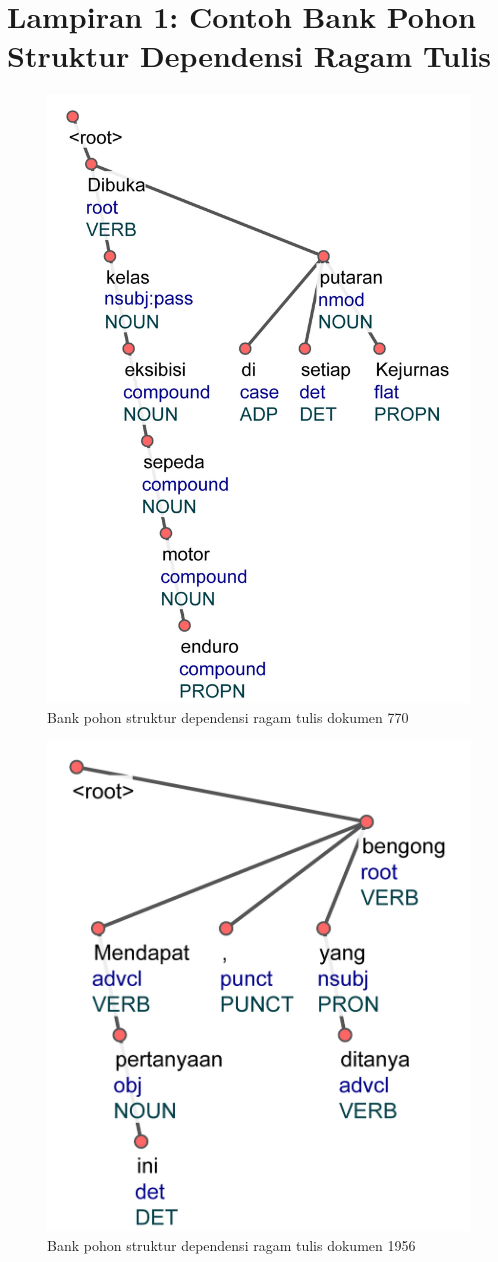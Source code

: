 


\chapter*{Lampiran 1: Contoh Bank Pohon Struktur Dependensi Ragam Tulis}

\begin{figure}
	\centering \includegraphics[width=0.35
	\textwidth] {pics/lampiran/lampirants770.jpg} 
	\caption[]{Bank pohon struktur dependensi ragam tulis dokumen 770} 
	\label{fig:lampirants770} 
\end{figure}

\begin{figure}
	\centering \includegraphics[width=0.3
	\textwidth] {pics/lampiran/lampirants1956.jpg} 
	\caption[]{Bank pohon struktur dependensi ragam tulis dokumen 1956} 
	\label{fig:lampirants1956} 
\end{figure}

